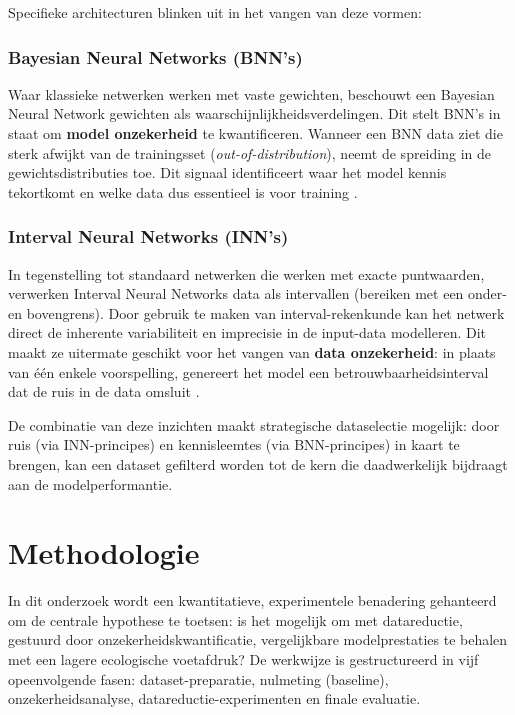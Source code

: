 Specifieke architecturen blinken uit in het vangen van deze vormen:

\subsubsection{Bayesian Neural Networks (BNN's)} 
Waar klassieke netwerken werken met vaste gewichten, beschouwt een Bayesian Neural Network gewichten als waarschijnlijkheidsverdelingen. Dit stelt BNN's in staat om \textbf{model onzekerheid} te kwantificeren. Wanneer een BNN data ziet die sterk afwijkt van de trainingsset (\textit{out-of-distribution}), neemt de spreiding in de gewichtsdistributies toe. Dit signaal identificeert waar het model kennis tekortkomt en welke data dus essentieel is voor training \autocite{blundell2015weight, jospin2022hands}.\\

\subsubsection{Interval Neural Networks (INN's)} 
In tegenstelling tot standaard netwerken die werken met exacte puntwaarden, verwerken Interval Neural Networks data als intervallen (bereiken met een onder- en bovengrens). Door gebruik te maken van interval-rekenkunde kan het netwerk direct de inherente variabiliteit en imprecisie in de input-data modelleren. Dit maakt ze uitermate geschikt voor het vangen van \textbf{data onzekerheid}: in plaats van één enkele voorspelling, genereert het model een betrouwbaarheidsinterval dat de ruis in de data omsluit \autocite{ishibuchi1993architecture}.

De combinatie van deze inzichten maakt strategische dataselectie mogelijk: door ruis (via INN-principes) en kennisleemtes (via BNN-principes) in kaart te brengen, kan een dataset gefilterd worden tot de kern die daadwerkelijk bijdraagt aan de modelperformantie.


\section{Methodologie}
\label{sec:methodologie}

In dit onderzoek wordt een kwantitatieve, experimentele benadering gehanteerd om de centrale hypothese te toetsen: is het mogelijk om met datareductie, gestuurd door onzekerheidskwantificatie, vergelijkbare modelprestaties te behalen met een lagere ecologische voetafdruk? De werkwijze is gestructureerd in vijf opeenvolgende fasen: dataset-preparatie, nulmeting (baseline), onzekerheidsanalyse, datareductie-experimenten en finale evaluatie.


